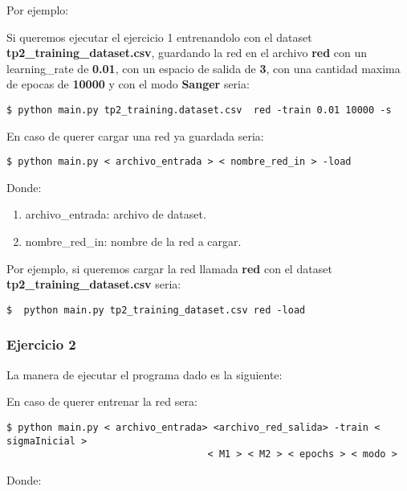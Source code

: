 Por ejemplo: 

Si queremos ejecutar el ejercicio 1 entrenandolo con el dataset \textbf{tp2\_training\_dataset.csv}, guardando la red en el archivo 
\textbf{red} con un learning\_rate de \textbf{0.01}, con un espacio de salida de \textbf{3}, con una cantidad maxima de epocas de \textbf{10000} y con el modo \textbf{Sanger} seria:

\begin{verbatim}
$ python main.py tp2_training.dataset.csv  red -train 0.01 10000 -s
\end{verbatim}

En caso de querer cargar una red ya guardada seria:

\begin{verbatim}
$ python main.py < archivo_entrada > < nombre_red_in > -load
\end{verbatim}

Donde:

\begin{enumerate}
\item archivo\_entrada: archivo de dataset.
\item nombre\_red\_in: nombre de la red a cargar.
\end{enumerate}

Por ejemplo, si queremos cargar la red llamada \textbf{red} con el dataset \textbf{tp2\_training\_dataset.csv} seria:

\begin{verbatim}
$  python main.py tp2_training_dataset.csv red -load
\end{verbatim}

\subsubsection{Ejercicio 2}

La manera de ejecutar el programa dado es la siguiente:

En caso de querer entrenar la red sera:

\begin{verbatim}
$ python main.py < archivo_entrada> <archivo_red_salida> -train < sigmaInicial > 
                                   < M1 > < M2 > < epochs > < modo >
\end{verbatim}

Donde:

